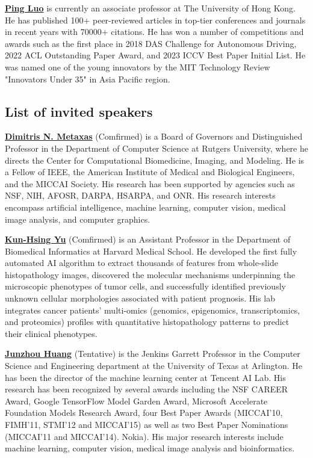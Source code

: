 \documentclass{article}
\begin{document}
\noindent
\textbf{\href{http://luoping.me/}{Ping Luo}} is currently an associate professor at The University of Hong Kong. He has published 100+ peer-reviewed articles in top-tier conferences and journals in recent years with 70000+ citations. He has won a number of competitions and awards such as the first place in 2018 DAS Challenge for Autonomous Driving, 2022 ACL Outstanding Paper Award, and 2023 ICCV Best Paper Initial List. He was named one of the young innovators by the MIT Technology Review "Innovators Under 35" in Asia Pacific region.



\subsection{List of invited speakers}

\textbf{\href{https://people.cs.rutgers.edu/~dnm/}{Dimitris N. Metaxas}} (Comfirmed) is a Board of Governors and Distinguished Professor in the Department of Computer Science at Rutgers University, where he directs the Center for Computational Biomedicine, Imaging, and Modeling. He is a Fellow of IEEE, the American Institute of Medical and Biological Engineers, and the MICCAI Society. His research has been supported by agencies such as NSF, NIH, AFOSR, DARPA, HSARPA, and ONR. His research interests encompass artificial intelligence, machine learning, computer vision, medical image analysis, and computer graphics.


\noindent
\textbf{\href{https://dbmi.hms.harvard.edu/people/kun-hsing-yu}{Kun-Hsing Yu}} (Comfirmed) is an Assistant Professor in the Department of Biomedical Informatics at Harvard Medical School. He developed the first fully automated AI algorithm to extract thousands of features from whole-slide histopathology images, discovered the molecular mechanisms underpinning the microscopic phenotypes of tumor cells, and successfully identified previously unknown cellular morphologies associated with patient prognosis. His lab integrates cancer patients' multi-omics (genomics, epigenomics, transcriptomics, and proteomics) profiles with quantitative histopathology patterns to predict their clinical phenotypes. 


\noindent
\textbf{\href{https://ranger.uta.edu/~huang/}{Junzhou Huang}} (Tentative) is the Jenkins Garrett Professor in the Computer Science and Engineering department at the University of Texas at Arlington. He has been the director of the machine learning center at Tencent AI Lab. His research has been recognized by several awards including the NSF CAREER Award, Google TensorFlow Model Garden Award, Microsoft Accelerate Foundation Models Research Award, four Best Paper Awards (MICCAI'10, FIMH'11, STMI'12 and MICCAI'15) as well as two Best Paper Nominations (MICCAI'11 and MICCAI'14). Nokia). His major research interests include machine learning, computer vision, medical image analysis and bioinformatics.
\end{document}
